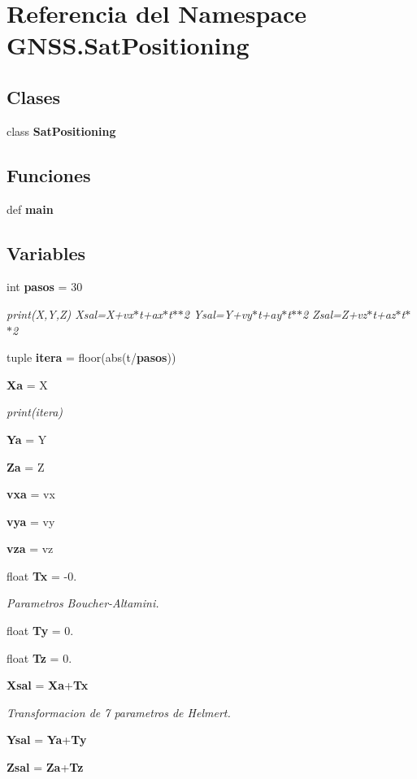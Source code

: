 \section{Referencia del Namespace G\-N\-S\-S.\-Sat\-Positioning}
\label{namespaceGNSS_1_1SatPositioning}
\subsection*{Clases}
\begin{DoxyCompactItemize}
\item 
class {\bf Sat\-Positioning}
\end{DoxyCompactItemize}
\subsection*{Funciones}
\begin{DoxyCompactItemize}
\item 
def {\bf main}
\end{DoxyCompactItemize}
\subsection*{Variables}
\begin{DoxyCompactItemize}
\item 
int {\bf pasos} = 30
\begin{DoxyCompactList}\small\item\em print(\-X,\-Y,\-Z) Xsal=X+vx$\ast$t+ax$\ast$t$\ast$$\ast$2 Ysal=Y+vy$\ast$t+ay$\ast$t$\ast$$\ast$2 Zsal=Z+vz$\ast$t+az$\ast$t$\ast$$\ast$2 \end{DoxyCompactList}\item 
tuple {\bf itera} = floor(abs(t/{\bf pasos}))
\item 
{\bf Xa} = X
\begin{DoxyCompactList}\small\item\em print(itera) \end{DoxyCompactList}\item 
{\bf Ya} = Y
\item 
{\bf Za} = Z
\item 
{\bf vxa} = vx
\item 
{\bf vya} = vy
\item 
{\bf vza} = vz
\item 
float {\bf Tx} = -\/0.
\begin{DoxyCompactList}\small\item\em Parametros Boucher-\/\-Altamini. \end{DoxyCompactList}\item 
float {\bf Ty} = 0.
\item 
float {\bf Tz} = 0.
\item 
{\bf Xsal} = {\bf Xa}+{\bf Tx}
\begin{DoxyCompactList}\small\item\em Transformacion de 7 parametros de Helmert. \end{DoxyCompactList}\item 
{\bf Ysal} = {\bf Ya}+{\bf Ty}
\item 
{\bf Zsal} = {\bf Za}+{\bf Tz}
\end{DoxyCompactItemize}


